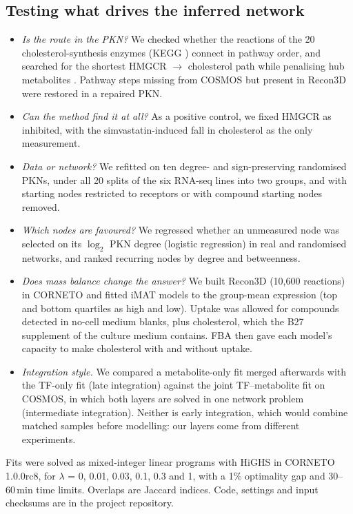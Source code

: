 \documentclass[11pt, a4paper]{article}
\begin{document}
\subsection{Testing what drives the inferred network}
\begin{itemize}[noitemsep, topsep=2pt, leftmargin=*]
  \item \emph{Is the route in the PKN?} We checked whether the reactions of the 20
        cholesterol-synthesis enzymes (KEGG \cite{kanehisa2000kegg}) connect in pathway order, and
        searched for the shortest HMGCR $\to$ cholesterol path while penalising hub metabolites
        \cite{croes2006weighted}. Pathway steps missing from COSMOS but present in Recon3D were
        restored in a repaired PKN.
  \item \emph{Can the method find it at all?} As a positive control, we fixed HMGCR as inhibited,
        with the simvastatin-induced fall in cholesterol as the only measurement.
  \item \emph{Data or network?} We refitted on ten degree- and sign-preserving randomised PKNs,
        under all 20 splits of the six RNA-seq lines into two groups, and with starting nodes
        restricted to receptors or with compound starting nodes removed.
  \item \emph{Which nodes are favoured?} We regressed whether an unmeasured node was selected on
        its $\log_2$ PKN degree (logistic regression) in real and randomised networks, and ranked
        recurring nodes by degree and betweenness.
  \item \emph{Does mass balance change the answer?} We built Recon3D (10,600 reactions) in CORNETO
        and fitted iMAT models \cite{shlomi2008imat} to the group-mean expression (top and bottom
        quartiles as high and low). Uptake was allowed for compounds detected in no-cell medium
        blanks, plus cholesterol, which the B27 supplement of the culture medium contains. FBA
        \cite{orth2010fba} then gave each model's capacity to make cholesterol with and without
        uptake.
  \item \emph{Integration style.} We compared a metabolite-only fit merged afterwards with the
        TF-only fit (late integration) against the joint TF--metabolite fit on COSMOS, in which
        both layers are solved in one network problem (intermediate integration). Neither is early integration,
        which would combine matched samples before modelling: our layers come from different
        experiments.
\end{itemize}
Fits were solved as mixed-integer linear programs with HiGHS \cite{huangfu2018highs} in CORNETO
1.0.0rc8, for $\lambda$ = 0, 0.01, 0.03, 0.1, 0.3 and 1, with a 1\% optimality gap and 30--60\,min
time limits. Overlaps are Jaccard
indices. Code, settings and input checksums are in the project repository.
\end{document}
